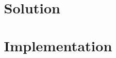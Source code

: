 \documentclass{tk3-team}
\begin{document}
\section{Solution}


\section{Implementation}
\end{document}
